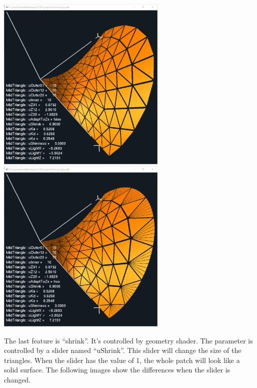 \documentclass[letterpaper,14pt,titlepage,fleqn]{article}
\begin{document}
\begin{center}
	\includegraphics[width=3.2in]{adaptZ1.jpg}
	\includegraphics[width=3.2in]{adaptZ2.jpg}
\end{center}
The last feature is ``shrink''. It's controlled by geometry shader. The parameter is controlled by a slider named ``uShrink''. This slider will change the size of the triangles. When the slider has the value of 1, the whole patch will look like a solid surface. The following images show the differences when the slider is changed.
\end{document}
